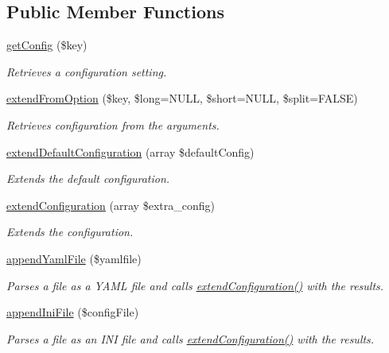 \subsection*{Public Member Functions}
\begin{DoxyCompactItemize}
\item 
\hyperlink{interfaceConfigurationManagerInterface_a4cdfd6f50bcd009bf5d5319c8d8cf735}{get\-Config} (\$key)
\begin{DoxyCompactList}\small\item\em Retrieves a configuration setting. \end{DoxyCompactList}\item 
\hyperlink{interfaceConfigurationManagerInterface_afefe2ed7fa23a9b5c394505afbb108af}{extend\-From\-Option} (\$key, \$long=N\-U\-L\-L, \$short=N\-U\-L\-L, \$split=F\-A\-L\-S\-E)
\begin{DoxyCompactList}\small\item\em Retrieves configuration from the arguments. \end{DoxyCompactList}\item 
\hyperlink{interfaceConfigurationManagerInterface_add03fd09e040207a4620bc434da85ab6}{extend\-Default\-Configuration} (array \$default\-Config)
\begin{DoxyCompactList}\small\item\em Extends the default configuration. \end{DoxyCompactList}\item 
\hyperlink{interfaceConfigurationManagerInterface_a728b1d304084f2118b5f709257531ca5}{extend\-Configuration} (array \$extra\-\_\-config)
\begin{DoxyCompactList}\small\item\em Extends the configuration. \end{DoxyCompactList}\item 
\hyperlink{interfaceConfigurationManagerInterface_a0f77fdbc31965a674c15dab2ec068f6e}{append\-Yaml\-File} (\$yamlfile)
\begin{DoxyCompactList}\small\item\em Parses a file as a Y\-A\-M\-L file and calls \hyperlink{interfaceConfigurationManagerInterface_a728b1d304084f2118b5f709257531ca5}{extend\-Configuration()} with the results. \end{DoxyCompactList}\item 
\hyperlink{interfaceConfigurationManagerInterface_ae0bd040a0ef470cdec353738e6306870}{append\-Ini\-File} (\$config\-File)
\begin{DoxyCompactList}\small\item\em Parses a file as an I\-N\-I file and calls \hyperlink{interfaceConfigurationManagerInterface_a728b1d304084f2118b5f709257531ca5}{extend\-Configuration()} with the results. \end{DoxyCompactList}\item 

\end{DoxyCompactItemize}
